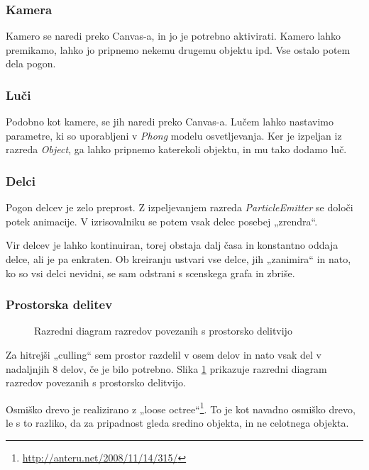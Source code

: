\documentclass[a4paper]{article}
\begin{document}
\subsubsection{Kamera}
Kamero se naredi preko Canvas-a, in jo je potrebno aktivirati. Kamero lahko premikamo, lahko jo pripnemo nekemu drugemu objektu ipd. Vse ostalo potem dela pogon.

\subsubsection{Luči}
Podobno kot kamere, se jih naredi preko Canvas-a. Lučem lahko nastavimo parametre, ki so uporabljeni v \emph{Phong} modelu osvetljevanja. Ker je izpeljan iz razreda \emph{Object}, ga lahko pripnemo katerekoli objektu, in mu tako dodamo luč.

\subsubsection{Delci}
Pogon delcev je zelo preprost. Z izpeljevanjem razreda \emph{ParticleEmitter} se določi potek animacije. V izrisovalniku se potem vsak delec posebej „zrendra“.

Vir delcev je lahko kontinuiran, torej obstaja dalj časa in konstantno oddaja delce, ali je pa enkraten. Ob kreiranju ustvari vse delce, jih „zanimira“ in nato, ko so vsi delci nevidni, se sam odstrani s scenskega grafa in zbriše.

\subsubsection{Prostorska delitev}
\begin{figure}
  \centering
  
  \caption{Razredni diagram razredov povezanih s prostorsko delitvijo}
  \label{graf:scene_partitioning}
\end{figure}

Za hitrejši „culling“ sem prostor razdelil v osem delov in nato vsak del v nadaljnjih 8 delov, če je bilo potrebno. Slika \ref{graf:scene_partitioning} prikazuje razredni diagram razredov povezanih s prostorsko delitvijo.

Osmiško drevo je realizirano z „loose octree“\footnote{\href{http://anteru.net/2008/11/14/315/}{http://anteru.net/2008/11/14/315/}}. To je kot navadno osmiško drevo, le s to razliko, da za pripadnost gleda sredino objekta, in ne celotnega objekta.
\end{document}
